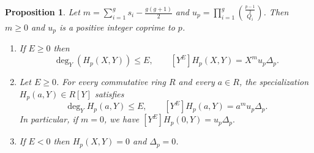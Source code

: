 \documentclass{amsart}
\theoremstyle{plain}
\newtheorem{proposition}[theorem]{Proposition}
\theoremstyle{remark}
\theoremstyle{remark}
\newcommand{\0}{\mathbf{0}}
\newcommand{\1}{\mathbf{1}}
\begin{document}
\begin{proposition}\label{P:D_p} %
Let
$m=\sum_{i=1}^gs_i-\frac{g(g+1)}{2}$ and $u_p=
    \prod_{i=1}^g\binom{\frac{p-1}{2}}{Q_i}$.
Then $m\ge 0$ and $u_p$ is a positive integer coprime to $p$. 
\begin{enumerate}
\item If $E\ge 0$ then 
$$\deg_Y(H_{p}(X,Y))\le E, \qquad
[Y^E]H_{p}(X,Y) =X^m u_p \Delta_p.$$
\item Let $E\ge 0$. For every commutative ring $R$ and every $a \in R$, the specialization $H_p(a,Y)\in R[Y]$ satisfies 
$$
\deg_YH_p(a,Y)\le E, \qquad 
[Y^E]H_p(a,Y)=a^m u_p \Delta_p.
$$
In particular, if $m=0$, we have $[Y^E]H_p(0,Y)=u_p\Delta_p.$
\item 
If $E<0$ then $H_{p}(X,Y)=0$ and $\Delta_p=0$.
\end{enumerate}
\end{proposition}
\end{document}
